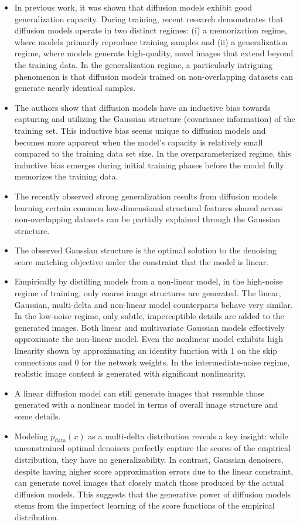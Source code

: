 \documentclass{article}
\begin{document}
\begin{itemize}
    \item In previous work, it was shown that diffusion models exhibit good generalization capacity. During training, recent research demonstrates that diffusion models operate in two distinct regimes: (i) a memorization regime, where models primarily reproduce training samples and (ii) a generalization regime, where models generate high-quality, novel images that extend beyond the training data. In the generalization regime, a particularly intriguing phenomenon is that diffusion models trained on non-overlapping datasets can generate nearly identical samples.
    \item The authors show that diffusion models have an inductive bias towards capturing and utilizing the Gaussian structure (covariance information) of the training set. This inductive bias seems unique to diffusion models and becomes more apparent when the model's capacity is relatively small compared to the training data set size. In the overparameterized regime, this inductive bias emerges during initial training phases before the model fully memorizes the training data.
    \item The recently observed strong generalization results from diffusion models learning certain common low-dimensional structural features shared across non-overlapping datasets can be partially explained through the Gaussian structure.
    \item The observed Gaussian structure is the optimal solution to the denoising score matching objective under the constraint that the model is linear. 
    \item Empirically by distilling models from a non-linear model, in the high-noise regime of training, only coarse image structures are generated. The linear, Gaussian, multi-delta and non-linear model counterparts behave very similar. In the low-noise regime, only subtle, imperceptible details are added to the generated images. Both linear and multivariate Gaussian models effectively approximate the non-linear model. Even the nonlinear model exhibits high linearity shown by approximating an identity function with 1 on the skip connections and 0 for the network weights. In the intermediate-noise regime, realistic image content is generated with significant nonlinearity. 
    \item A linear diffusion model can still generate images that resemble those generated with a nonlinear model in terms of overall image structure and some details.
    \item Modeling $p_{\text{data}}(x)$ as a multi-delta distribution reveals a key insight: while unconstrained optimal denoisers perfectly capture the scores of the empirical distribution, they have no generalizability. In contrast, Gaussian denoisers, despite having higher score approximation errors due to the linear constraint, can generate novel images that closely match those produced by the actual diffusion models. This suggests that the generative power of diffusion models stems from the imperfect learning of the score functions of the empirical distribution.

\end{itemize}
\end{document}
